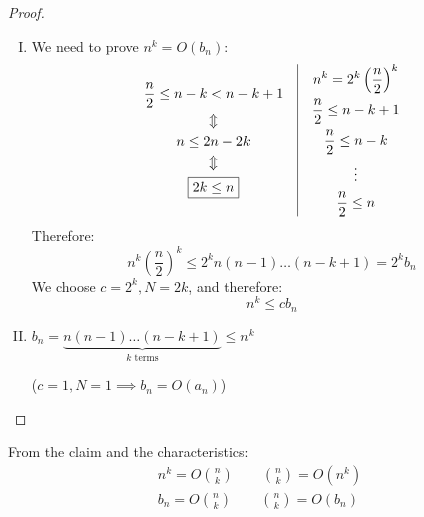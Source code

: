 \documentclass[00_complete]{subfiles}
\begin{document}
\begin{proof}
    \begin{enumerate}[I.]
        \item We need to prove $n^k = O(b_n)$:
            $$
            \begin{gathered}
                \frac{n}{2} \leq n-k<n-k+1 \\
                \Updownarrow \\
                n\leq 2n-2k \\
                \Updownarrow \\
                \boxed{2k\leq n}
            \end{gathered} \quad \vline \quad
            \begin{gathered}
                n^k=2^k\left(\frac{n}{2}\right)^k \\
                \frac{n}{2} \leq n-k+1 \\
                \frac{n}{2}\leq n-k \\ \vdots \\
                \frac{n}{2} \leq n
            \end{gathered}
            $$
            Therefore:
            $$n^k\left(\frac{n}{2}\right)^k \leq 2^kn(n-1)\dots(n-k+1) = 2^kb_n$$
            We choose $c=2^k, N=2k$, and therefore:
            $$n^k\leq cb_n$$
        \item $b_n= \underbrace{n(n-1)\dots(n-k+1)}_{k \text{ terms}} \leq n^k$

            ($c=1, N=1 \implies b_n=O(a_n)$)
    \end{enumerate}
\end{proof}
\begin{conclusion}
    From the claim and the characteristics:
    \begin{gather*}
        n^k = O\binom{n}{k} \qquad \binom{n}{k} = O(n^k) \\
        b_n = O\binom{n}{k} \qquad \binom{n}{k} = O(b_n)
    \end{gather*}
\end{conclusion}
\end{document}
